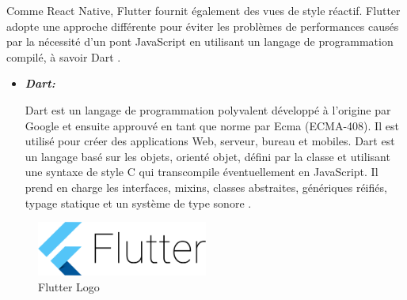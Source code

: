 Comme React Native, Flutter fournit également des vues de style réactif. Flutter adopte une approche différente pour éviter les problèmes de performances causés par la nécessité d’un pont JavaScript en utilisant un langage de programmation compilé, à savoir Dart \cite{rahmouniBindex}.
\renewcommand{\labelitemi}{$\bullet$}
\begin{itemize}
    \item \textbf{\textit{Dart:}}

          Dart est un langage de programmation polyvalent développé à l’origine par Google et ensuite approuvé en tant que norme par Ecma (ECMA-408). Il est utilisé pour créer des applications Web, serveur, bureau et mobiles.
          Dart est un langage basé sur les objets, orienté objet, défini par la classe et utilisant une syntaxe de style C qui transcompile éventuellement en JavaScript. Il prend en charge les interfaces, mixins, classes abstraites, génériques réifiés, typage statique et un système de type sonore \cite{WhatRevolutionaryFlutter}.
\end{itemize}
\begin{figure}[h!]
    \center
    \includegraphics[width=0.50\textwidth]{Images/chapter3/flutter.png}
    \caption{Flutter Logo}
    \label{fig:Technologies}
\end{figure}





